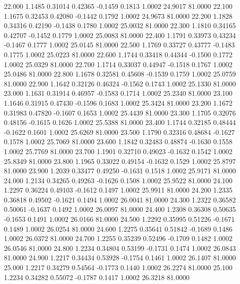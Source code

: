  22.000   1.1485   0.31014   0.42365  -0.1459   0.1813   1.0002  24.9017  81.0000
  22.100   1.1675   0.32453   0.42080  -0.1442   0.1792   1.0002  24.9673  81.0000
  22.200   1.1828   0.34316   0.42190  -0.1438   0.1780   1.0002  25.0032  81.0000
  22.300   1.1810   0.34165   0.42707  -0.1452   0.1779   1.0002  25.0083  81.0000
  22.400   1.1791   0.33973   0.43234  -0.1467   0.1777   1.0002  25.0145  81.0000
  22.500   1.1769   0.33727   0.43777  -0.1483   0.1775   1.0002  25.0223  81.0000
  22.600   1.1744   0.33418   0.44344  -0.1500   0.1772   1.0002  25.0329  81.0000
  22.700   1.1714   0.33037   0.44947  -0.1518   0.1767   1.0002  25.0486  81.0000
  22.800   1.1678   0.32581   0.45608  -0.1539   0.1759   1.0002  25.0759  81.0000
  22.900   1.1642   0.32126   0.46324  -0.1562   0.1743   1.0002  25.1330  81.0000
  23.000   1.1631   0.31914   0.46957  -0.1583   0.1714   1.0002  25.2340  81.0000
  23.100   1.1646   0.31915   0.47430  -0.1596   0.1683   1.0002  25.3424  81.0000
  23.200   1.1672   0.31983   0.47820  -0.1607   0.1653   1.0002  25.4439  81.0000
  23.300   1.1705   0.32076   0.48156  -0.1615   0.1626   1.0002  25.5388  81.0000
  23.400   1.1744   0.32185   0.48444  -0.1622   0.1601   1.0002  25.6269  81.0000
  23.500   1.1790   0.32316   0.48684  -0.1627   0.1578   1.0002  25.7069  81.0000
  23.600   1.1842   0.32483   0.48874  -0.1630   0.1558   1.0002  25.7769  81.0000
  23.700   1.1901   0.32710   0.49023  -0.1632   0.1542   1.0002  25.8349  81.0000
  23.800   1.1965   0.33022   0.49154  -0.1632   0.1529   1.0002  25.8797  81.0000
  23.900   1.2039   0.33477   0.49250  -0.1631   0.1518   1.0002  25.9171  81.0000
  24.000   1.2134   0.34265   0.49263  -0.1626   0.1508   1.0002  25.9522  81.0000
  24.100   1.2297   0.36224   0.49103  -0.1612   0.1497   1.0002  25.9911  81.0000
  24.200   1.2335   0.36818   0.49502  -0.1621   0.1494   1.0002  26.0041  81.0000
  24.300   1.2322   0.36582   0.50061  -0.1637   0.1492   1.0002  26.0097  81.0000
  24.400   1.2308   0.36308   0.50635  -0.1653   0.1491   1.0002  26.0166  81.0000
  24.500   1.2292   0.35995   0.51226  -0.1671   0.1489   1.0002  26.0254  81.0000
  24.600   1.2275   0.35641   0.51842  -0.1689   0.1486   1.0002  26.0372  81.0000
  24.700   1.2255   0.35239   0.52496  -0.1709   0.1482   1.0002  26.0546  81.0000
  24.800   1.2234   0.34804   0.53199  -0.1731   0.1474   1.0002  26.0843  81.0000
  24.900   1.2217   0.34434   0.53928  -0.1754   0.1461   1.0002  26.1407  81.0000
  25.000   1.2217   0.34279   0.54564  -0.1773   0.1440   1.0002  26.2274  81.0000
  25.100   1.2234   0.34282   0.55072  -0.1787   0.1417   1.0002  26.3218  81.0000
